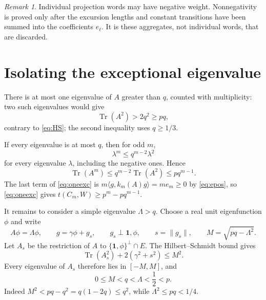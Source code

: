 \documentclass[11pt]{article}
\numberwithin{equation}{section}
\theoremstyle{remark}
\newtheorem{remark}[theorem]{Remark}
\newcommand{\Tr}{\operatorname{Tr}}
\newcommand{\one}{\mathbf 1}
\newcommand{\norm}[1]{\lVert #1\rVert}
\newcommand{\ip}[2]{\langle #1,#2\rangle}
\begin{document}
\begin{remark}
Individual projection words may have negative weight. Nonnegativity is proved only after the excursion lengths and constant transitions have been summed into the coefficients $e_\ell$. It is these aggregates, not individual words, that are discarded.
\end{remark}

\section{Isolating the exceptional eigenvalue}\label{sec:isolate}
There is at most one eigenvalue of $A$ greater than $q$, counted with multiplicity: two such eigenvalues would give
\[
 \Tr(A^2)>2q^2\ge pq,
\]
contrary to \eqref{eq:HS}; the second inequality uses $q\ge1/3$.

If every eigenvalue is at most $q$, then for odd $m$,
\[
 \lambda^m\le q^{m-2}\lambda^2
\]
for every eigenvalue $\lambda$, including the negative ones. Hence
\[
 \Tr(A^m)\le q^{m-2}\Tr(A^2)\le pq^{m-1}.
\]
The last term of \eqref{eq:oneexc} is $m\ip{g}{k_m(A)g}=me_m\ge0$ by \eqref{eq:epos}, so \eqref{eq:oneexc} gives $t(C_m,W)\ge p^m-pq^{m-1}$.

It remains to consider a simple eigenvalue $\Lambda>q$. Choose a real unit eigenfunction $\phi$ and write
\begin{equation}\label{eq:split}
 A\phi=\Lambda\phi,\qquad
 g=\gamma\phi+g_s,\qquad g_s\perp\one,\phi,\qquad
 s=\norm{g_s},\qquad M=\sqrt{pq-\Lambda^2}.
\end{equation}
Let $A_s$ be the restriction of $A$ to $\{\one,\phi\}^\perp\cap E$. The Hilbert--Schmidt bound gives
\begin{equation}\label{eq:safeHS}
 \Tr(A_s^2)+2(\gamma^2+s^2)\le M^2.
\end{equation}
Every eigenvalue of $A_s$ therefore lies in $[-M,M]$, and
\begin{equation}\label{eq:ordering}
 0\le M<q<\Lambda<\frac12<p.
\end{equation}
Indeed $M^2<pq-q^2=q(1-2q)\le q^2$, while $\Lambda^2\le pq<1/4$.
\end{document}
